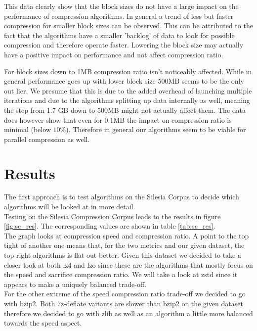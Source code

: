 \documentclass[
	12pt,
	a4paper,
	BCOR10mm,
	DIV14,
	listof=totoc,
	bibliography=totoc,
	headsepline
]{scrreprt}
\begin{document}

This data clearly show that the block sizes do not have a large impact on the performance of compression algorithms. 
In general a trend of less but faster compression for smaller block sizes can be observed.
This can be attributed to the fact that the algorithms have a smaller 'backlog' of data to look for possible compression and therefore operate faster.
Lowering the block size may actually have a positive impact on performance and not affect compression ratio.

For block sizes down to 1MB compression ratio isn't noticeably affected.
While in general performance goes up with lower block size 500MB seems to be the only out lier.
We presume that this is due to the added overhead of launching multiple iterations and due to the algorithms splitting up data internally as well, meaning the step from 1.7 GB down to 500MB might not actually affect them.
The data does however show that even for 0.1MB the impact on compression ratio is minimal (below $10\%$). 
Therefore in general our algorithms seem to be viable for parallel compression as well.

\FloatBarrier
\section{Results}
The first approach is to test algorithms on the Silesia Corpus to decide which algorithms will be looked at in more detail.
\\
Testing on the Silesia Compression Corpus leads to the results in figure \ref{fig:sc_res}. 
The corresponding values are shown in table \ref{tab:sc_res}. \\



The graph looks at compression speed and compression ratio. A point to the top tight of another one means that, for the two metrics and our given dataset, the top right algorithms is flat out better. Given this dataset we decided to take a closer look at both lz4 and lzo since these are the algorithms that mostly focus on the speed and sacrifice compression ratio. We will take a look at zstd since it appears to make a uniquely balanced trade-off. \\
For the other extreme of the speed compression ratio trade-off we decided to go with bzip2. Both 7z-deflate variants are slower than bzip2 on the given dataset therefore we decided to go with zlib as well as an algorithm a little more balanced towards the speed aspect.
\end{document}
